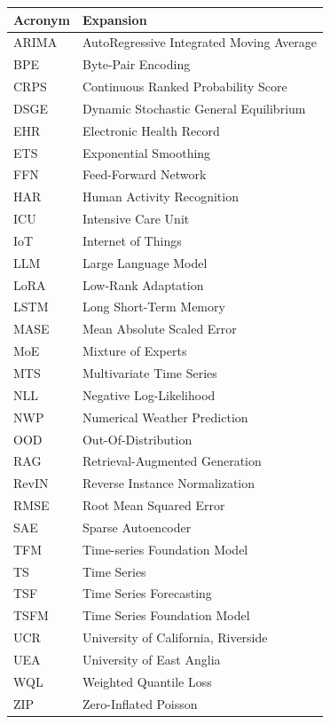 {\def\LTcaptype{none} %
\begin{longtable}[]{@{}ll@{}}
\toprule\noalign{}
Acronym & Expansion \\
\midrule\noalign{}
\endhead
\bottomrule\noalign{}
\endlastfoot
ARIMA & AutoRegressive Integrated Moving Average \\
BPE & Byte-Pair Encoding \\
CRPS & Continuous Ranked Probability Score \\
DSGE & Dynamic Stochastic General Equilibrium \\
EHR & Electronic Health Record \\
ETS & Exponential Smoothing \\
FFN & Feed-Forward Network \\
HAR & Human Activity Recognition \\
ICU & Intensive Care Unit \\
IoT & Internet of Things \\
LLM & Large Language Model \\
LoRA & Low-Rank Adaptation \\
LSTM & Long Short-Term Memory \\
MASE & Mean Absolute Scaled Error \\
MoE & Mixture of Experts \\
MTS & Multivariate Time Series \\
NLL & Negative Log-Likelihood \\
NWP & Numerical Weather Prediction \\
OOD & Out-Of-Distribution \\
RAG & Retrieval-Augmented Generation \\
RevIN & Reverse Instance Normalization \\
RMSE & Root Mean Squared Error \\
SAE & Sparse Autoencoder \\
TFM & Time-series Foundation Model \\
TS & Time Series \\
TSF & Time Series Forecasting \\
TSFM & Time Series Foundation Model \\
UCR & University of California, Riverside \\
UEA & University of East Anglia \\
WQL & Weighted Quantile Loss \\
ZIP & Zero-Inflated Poisson \\
\end{longtable}
}

